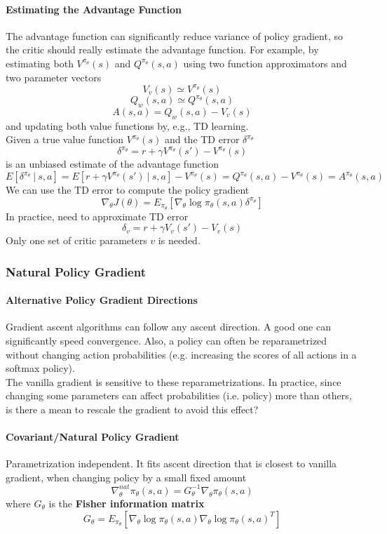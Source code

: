 \documentclass[10pt]{report}
\begin{document}
\paragraph{Estimating the Advantage Function} The advantage function can significantly reduce variance of policy gradient, so the critic should really estimate the advantage function. For example, by estimating both $V^{\pi_\theta}(s)$ and $Q^{\pi_\theta}(s,a)$ using two function approximators and two parameter vectors
$$V_v(s)\simeq V^{\pi_\theta}(s)$$
$$Q_w(s,a)\simeq Q^{\pi_\theta}(s,a)$$
$$A(s,a) = Q_w(s,a)-V_v(s)$$
and updating both value functions by, e.g., TD learning.\\
Given a true value function $V^{\pi_\theta}(s)$ and the TD error $\delta^{\pi_\theta}$ $$\delta^{\pi_\theta} = r+\gamma V^{\pi_\theta}(s')-V^{\pi_\theta}(s)$$
is an unbiased estimate of the advantage function
$$E[\delta^{\pi_\theta}\:|\:s,a]=E[r+\gamma V^{\pi_\theta}(s')\:|\:s,a]-V^{\pi_\theta}(s) = Q^{\pi_\theta}(s,a)-V^{\pi_\theta}(s) = A^{\pi_\theta}(s,a)$$
We can use the TD error to compute the policy gradient
$$\nabla_\theta J(\theta) = E_{\pi_\theta}[\nabla_\theta\log\pi_\theta(s,a)\delta^{\pi_\theta}]$$
In practice, need to approximate TD error
$$\delta_v = r+\gamma V_v(s')-V_v(s)$$
Only one set of critic parameters $v$ is needed.
\subsubsection{Natural Policy Gradient}
\paragraph{Alternative Policy Gradient Directions} Gradient ascent algorithms can follow any ascent direction. A good one can significantly speed convergence. Also, a policy can often be reparametrized without changing action probabilities (e.g. increasing the scores of all actions in a softmax policy).\\
The vanilla gradient is sensitive to these reparametrizations. In practice, since changing some parameters can affect probabilities (i.e. policy) more than others, is there a mean to rescale the gradient to avoid this effect?
\paragraph{Covariant/Natural Policy Gradient} Parametrization independent. It fits ascent direction that is closest to vanilla gradient, when changing policy by a small fixed amount
$$\nabla_\theta^{nat}\pi_\theta(s,a) = G_\theta^{-1}\nabla_\theta\pi_\theta(s,a)$$
where $G_\theta$ is the \textbf{Fisher information matrix} $$G_\theta = E_{\pi_\theta}[\nabla_\theta\log\pi_\theta(s,a)\nabla_\theta\log\pi_\theta (s,a)^T]$$
\end{document}
